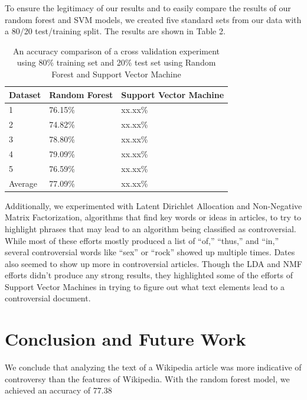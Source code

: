 \documentclass{article}
\begin{document}
To ensure the legitimacy of our results and to easily compare the results of our random forest and SVM models, we created five standard sets from our data with a 80/20 test/training split. The results are shown in Table 2. 

\begin{table}[ht]
	
	\centering %
	\begin{tabular}{l l l}
		
		Dataset & Random Forest & Support Vector Machine \\ [0.5ex] %
		\hline %
		1 & 76.15\% & xx.xx\% \\
		2 & 74.82\% & xx.xx\%  \\
		3 & 78.80\% & xx.xx\% \\
		4 & 79.09\% & xx.xx\% \\
		5 & 76.59\% & xx.xx\% \\
		Average & 77.09\% & xx.xx\%  \\
		\hline %
	\end{tabular}
	\label{table:compare} %
	\caption{ An accuracy comparison of a cross validation experiment using 80\% training set and 20\% test set using Random Forest and Support Vector Machine} 
\end{table}


Additionally, we experimented with Latent Dirichlet Allocation and Non-Negative Matrix Factorization, algorithms that find key words or ideas in articles, to try to highlight phrases that may lead to an algorithm being classified as controversial. While most of these efforts mostly produced a list of “of,” “thus,” and “in,” several controversial words like “sex” or “rock” showed up multiple times. Dates also seemed to show up more in controversial articles. Though the LDA and NMF efforts didn’t produce any strong results, they highlighted some of the efforts of Support Vector Machines in trying to figure out what text elements lead to a controversial document.

\section{Conclusion and Future Work}
We conclude that analyzing the text of a Wikipedia article was more indicative of controversy than the features of Wikipedia. With the random forest model, we achieved an accuracy of 77.38%
\end{document}
